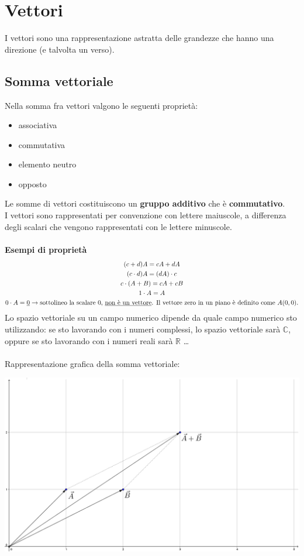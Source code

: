 \documentclass[italian]{article}
\begin{document}
\pagebreak
\section{Vettori}
I vettori sono una rappresentazione astratta delle grandezze che hanno una
direzione (e talvolta un verso).

\subsection{Somma vettoriale}
Nella somma fra vettori valgono le seguenti proprietà:
\begin{itemize}
	\item associativa
	\item commutativa
	\item elemento neutro
	\item opposto
\end{itemize}
Le somme di vettori costituiscono un \textbf{gruppo additivo} che è \textbf{commutativo}.\\
I vettori sono rappresentati per convenzione con lettere maiuscole, a differenza degli scalari che vengono rappresentati con le lettere minuscole.\\\\
\textbf{Esempi di proprietà}
\begin{gather*}
	(c+d)A = cA + dA\\
	(c\cdot d)A = (dA)\cdot c \\
	c\cdot (A+B)=cA + cB\\
	1 \cdot A = A \\
	0\cdot A = \underline{0} \to \text{sottolineo la scalare 0, \underline{non è un vettore}. Il vettore zero in un piano è definito come } A(0,0).
\end{gather*}
Lo spazio vettoriale su un campo numerico dipende da quale campo numerico sto utilizzando: se sto lavorando con i numeri complessi, lo spazio vettoriale sarà $\mathbb{C}$, oppure se sto lavorando con i numeri reali sarà $\mathbb{R}$ \dots\\\\
Rappresentazione grafica della somma vettoriale:
\begin{center}
	\includegraphics[width=0.6\linewidth]{img/vettori.png}	
\end{center}
\pagebreak
\end{document}
